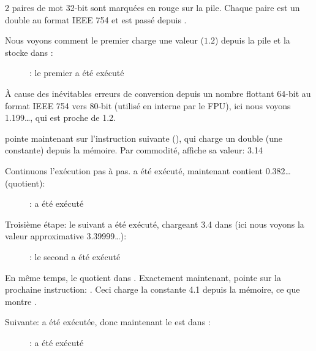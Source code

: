 ﻿\clearpage
{}
\myindex{\olly}

2 paires de mot 32-bit sont marquées en rouge sur la pile.
Chaque paire est un double au format IEEE 754 et est passé depuis \main.

Nous voyons comment le premier \FLD charge une valeur ($1.2$) depuis la pile et la
stocke dans :

\begin{figure}[H]
\centering
{}
\caption{\olly: le premier \FLD a été exécuté}
\label{fig:FPU_simple_olly_1}
\end{figure}

À cause des inévitables erreurs de conversion depuis un nombre flottant 64-bit au
format IEEE 754 vers 80-bit (utilisé en interne par le FPU), ici nous voyons 1.199\ldots,
qui est proche de 1.2.

\EIP pointe maintenant sur l'instruction suivante (\FDIV), qui charge un double
(une constante) depuis la mémoire.
Par commodité, \olly affiche sa valeur: 3.14

\clearpage
Continuons l'exécution pas à pas.
\FDIV a été exécuté, maintenant  contient 0.382\ldots
(\gls{quotient}):

\begin{figure}[H]
\centering
{}
\caption{\olly: \FDIV a été exécuté}
\label{fig:FPU_simple_olly_2}
\end{figure}

\clearpage
Troisième étape: le \FLD suivant a été exécuté, chargeant 3.4 dans  (ici nous
voyons la valeur approximative 3.39999\ldots):

\begin{figure}[H]
\centering
{}
\caption{\olly: le second \FLD a été exécuté}
\label{fig:FPU_simple_olly_3}
\end{figure}

En même temps, le \gls{quotient}  dans .
Exactement maintenant, \EIP pointe sur la prochaine instruction: \FMUL.
Ceci charge la constante 4.1 depuis la mémoire, ce que montre \olly.

\clearpage
Suivante: \FMUL a été exécutée, donc maintenant le  est dans :

\begin{figure}[H]
\centering
{}
\caption{\olly: \FMUL a été exécuté}
\label{fig:FPU_simple_olly_4}
\end{figure}

